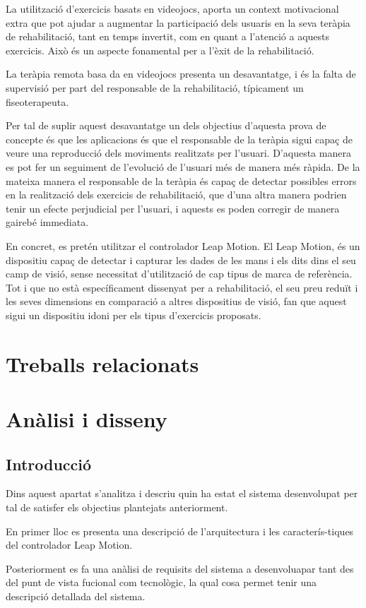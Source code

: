 \documentclass[12pt,a4paper,catalan]{article}
\begin{document}
	La utilització d’exercicis basats en videojocs, aporta un context motivacional extra que pot ajudar a augmentar la participació dels usuaris en la seva teràpia de rehabilitació, tant en temps invertit, com en quant a l’atenció a aquests exercicis. Això és un aspecte fonamental per a l’èxit de la rehabilitació.
	
	La teràpia remota basa da en videojocs presenta un desavantatge, i és la falta de supervisió per part del responsable de la rehabilitació, típicament un fiseoterapeuta.
	
	Per tal de suplir aquest desavantatge un dels objectius d’aquesta prova de concepte és que les aplicacions és que el responsable de la teràpia sigui capaç de veure una reproducció dels moviments realitzats per l’usuari. D’aquesta manera es pot fer un seguiment de l’evolució de l’usuari més de manera més ràpida. De la mateixa manera el responsable de la teràpia és capaç de detectar possibles errors en la realització dels exercicis de rehabilitació, que d’una altra manera podrien tenir un efecte perjudicial per l’usuari, i aquests es poden corregir de manera gairebé immediata.
	
	En concret, es pretén utilitzar el controlador Leap Motion. El Leap Motion, és un dispositiu capaç de detectar i capturar les dades de les mans i els dits dins el seu camp de visió, sense necessitat d’utilització de cap tipus de marca de referència. Tot i que no està específicament dissenyat per a rehabilitació, el seu preu reduït i les seves dimensions en comparació a altres dispositius de visió, fan que aquest sigui un dispositiu idoni per els tipus d’exercicis proposats.
	\section{Treballs relacionats}
	\section{Anàlisi i disseny}
	\subsection{Introducció}
	\indent Dins aquest apartat s’analitza i descriu quin ha estat el sistema desenvolupat per tal de satisfer els objectius plantejats anteriorment.
	
	En primer lloc es presenta una descripció de l’arquitectura i les caracterís-tiques del controlador Leap Motion.
	
	Posteriorment es fa una anàlisi de requisits del sistema a desenvoluapar tant des del punt de vista fucional com tecnològic, la qual cosa permet tenir una descripció detallada del sistema.
	
\end{document}
